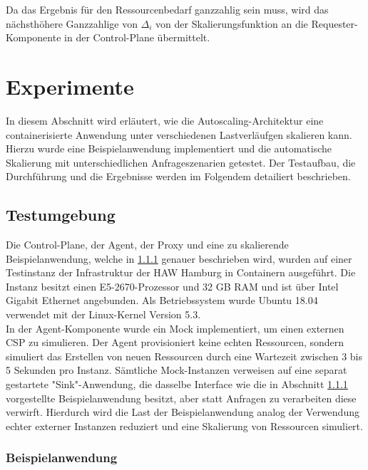 \documentclass[runningheads]{llncs}
\begin{document}
Da das Ergebnis für den Ressourcenbedarf ganzzahlig sein muss, wird das nächst\-höhere Ganzzahlige von $\Delta_{i}$ von der Skalierungsfunktion an die Requester-Kom\-ponente in der Control-Plane übermittelt.


\section{Experimente}

In diesem Abschnitt wird erläutert, wie die Autoscaling-Architektur eine containerisierte Anwendung unter verschiedenen Lastverläufgen skalieren kann. Hierzu wurde eine Beispielanwendung implementiert und die automatische Skalie\-rung mit unterschiedlichen Anfrageszenarien getestet. Der Testaufbau, die Durch\-führung und die Ergebnisse werden im Folgendem detailiert beschrieben.

\subsection{Testumgebung}

Die Control-Plane, der Agent, der Proxy und eine zu skalierende Beispielanwendung, welche in \ref{Beispielanwendung} genauer beschrieben wird, wurden auf einer Testinstanz der Infrastruktur der HAW Hamburg in Containern ausgeführt. Die Instanz besitzt einen E5-2670-Prozessor und 32 GB RAM und ist über Intel Gigabit Ethernet angebunden. Als Betriebssystem wurde Ubuntu 18.04 verwendet mit der Linux-Kernel Version 5.3. \\

In der Agent-Komponente wurde ein Mock implementiert, um einen externen CSP zu simulieren. Der Agent provisioniert keine echten Ressourcen, sondern simuliert das Erstellen von neuen Ressourcen durch eine Wartezeit zwischen 3 bis 5 Sekunden pro Instanz. Sämtliche Mock-Instanzen verweisen auf eine separat gestartete "Sink"-Anwendung, die dasselbe Interface wie die in Abschnitt \ref{Beispielanwendung} vorgestellte Beispielanwendung besitzt, aber statt Anfragen zu verarbeiten diese verwirft. Hierdurch wird die Last der Beispielanwendung analog der Verwendung echter externer Instanzen reduziert und eine Skalierung von Ressourcen simuliert.

\subsubsection{Beispielanwendung} \label{Beispielanwendung} \hfill\\
\end{document}
